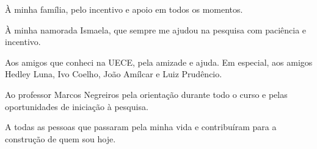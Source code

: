 À minha família, pelo incentivo e apoio em todos os momentos.

À minha namorada Ismaela, que sempre me ajudou na pesquisa com paciência e incentivo.

Aos amigos que conheci na UECE, pela amizade e ajuda. Em especial, aos amigos
Hedley Luna, Ivo Coelho, João Amílcar e Luiz Prudêncio.

Ao professor Marcos Negreiros pela orientação durante todo o curso e pelas oportunidades
de iniciação à pesquisa.

A todas as pessoas que passaram pela minha vida e contribuíram para a
construção de quem sou hoje.

